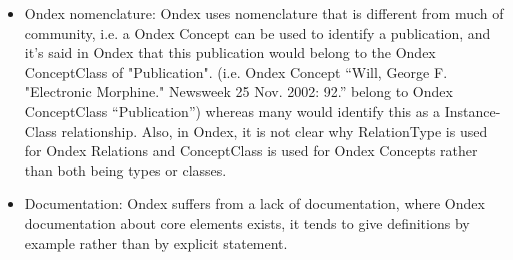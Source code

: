 \documentclass[a4paper,10pt]{article}
\newcommand{\nl}{\vskip 0.5cm \noindent}
\begin{document}
\begin{itemize}
\nl
\item Ondex nomenclature: Ondex uses nomenclature that is different from much of community, i.e. a Ondex Concept can be used to identify a publication, and it's said in Ondex that this publication would belong to the Ondex ConceptClass of "Publication". (i.e. Ondex Concept ``Will, George F. "Electronic Morphine." Newsweek 25 Nov. 2002: 92.'' belong to Ondex ConceptClass ``Publication'') whereas many would identify this as a Instance-Class relationship. Also, in Ondex, it is not clear why RelationType is used for Ondex Relations and ConceptClass is used for Ondex Concepts rather than both being types or classes.

\nl
\item Documentation: Ondex suffers from a lack of documentation, where Ondex documentation about core elements exists, it tends to give definitions by example rather than by explicit statement. 

\end{itemize}
\end{document}

